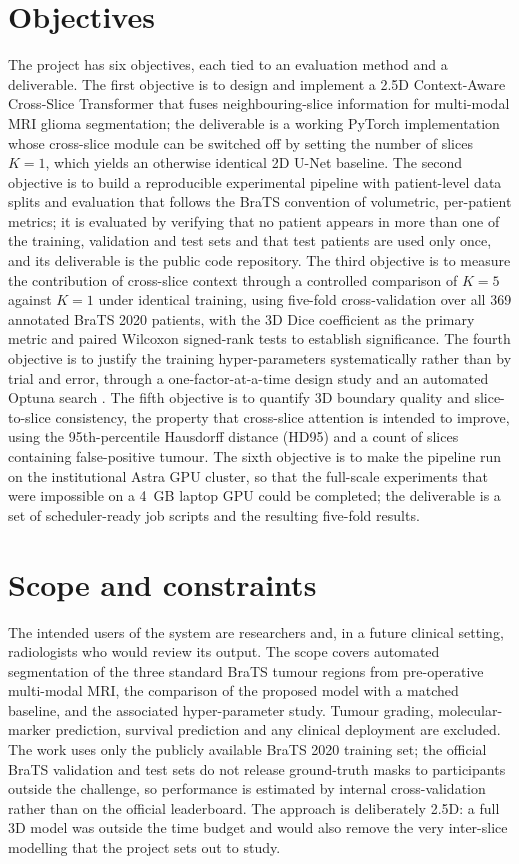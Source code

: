 \section{Objectives}
The project has six objectives, each tied to an evaluation method and a deliverable.
The first objective is to design and implement a 2.5D Context-Aware Cross-Slice Transformer that fuses neighbouring-slice information for multi-modal MRI glioma segmentation; the deliverable is a working PyTorch implementation whose cross-slice module can be switched off by setting the number of slices $K=1$, which yields an otherwise identical 2D U-Net baseline.
The second objective is to build a reproducible experimental pipeline with patient-level data splits and evaluation that follows the BraTS convention of volumetric, per-patient metrics; it is evaluated by verifying that no patient appears in more than one of the training, validation and test sets and that test patients are used only once, and its deliverable is the public code repository.
The third objective is to measure the contribution of cross-slice context through a controlled comparison of $K=5$ against $K=1$ under identical training, using five-fold cross-validation over all 369 annotated BraTS 2020 patients, with the 3D Dice coefficient as the primary metric and paired Wilcoxon signed-rank tests to establish significance.
The fourth objective is to justify the training hyper-parameters systematically rather than by trial and error, through a one-factor-at-a-time design study and an automated Optuna search \cite{akiba2019}.
The fifth objective is to quantify 3D boundary quality and slice-to-slice consistency, the property that cross-slice attention is intended to improve, using the 95th-percentile Hausdorff distance (HD95) and a count of slices containing false-positive tumour.
The sixth objective is to make the pipeline run on the institutional Astra GPU cluster, so that the full-scale experiments that were impossible on a 4~GB laptop GPU could be completed; the deliverable is a set of scheduler-ready job scripts and the resulting five-fold results.

\section{Scope and constraints}
The intended users of the system are researchers and, in a future clinical setting, radiologists who would review its output. The scope covers automated segmentation of the three standard BraTS tumour regions from pre-operative multi-modal MRI, the comparison of the proposed model with a matched baseline, and the associated hyper-parameter study. Tumour grading, molecular-marker prediction, survival prediction and any clinical deployment are excluded. The work uses only the publicly available BraTS 2020 training set; the official BraTS validation and test sets do not release ground-truth masks to participants outside the challenge, so performance is estimated by internal cross-validation rather than on the official leaderboard. The approach is deliberately 2.5D: a full 3D model was outside the time budget and would also remove the very inter-slice modelling that the project sets out to study.

